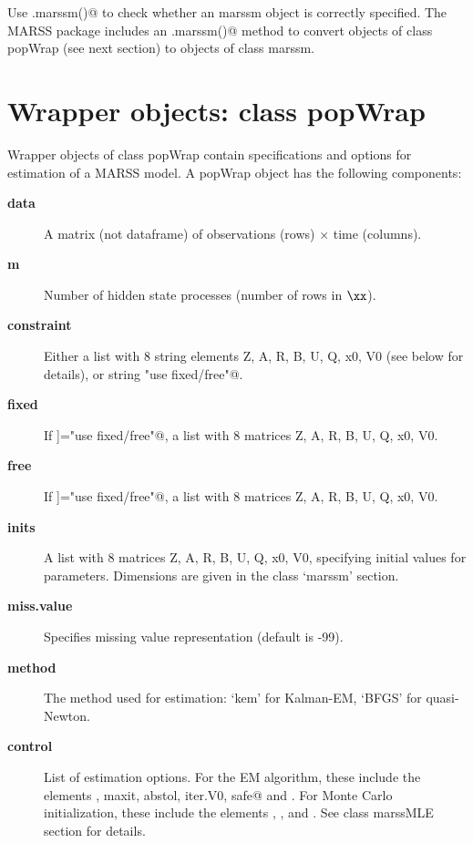 Use \verb@is.marssm()@ to check whether an marssm object is correctly specified. The MARSS package includes an \verb@as.marssm()@ method to convert objects of class popWrap (see next section) to objects of class marssm. 

\section{Wrapper objects: class popWrap}

Wrapper objects of class popWrap contain specifications and options for estimation of a MARSS model. A popWrap object has the following components:

  \begin{description}
  
  \item[\textbf{data}]{ A matrix (not dataframe) of observations (rows) $\times$ time (columns).  }
  \item[\textbf{m}]{ Number of hidden state processes (number of rows in $\xx$). }
  \item[\textbf{constraint}]{ Either a list with 8 string elements Z, A, R, B, U, Q, x0, V0 (see below for details), or string \verb@"use fixed/free"@. }
  \item[\textbf{fixed}]{ If \verb@constraint[[elem]]="use fixed/free"@, a list with 8 matrices Z, A, R, B, U, Q, x0, V0. }
  \item[\textbf{free}]{ If \verb@constraint[[elem]]="use fixed/free"@, a list with 8 matrices Z, A, R, B, U, Q, x0, V0. }
  \item[\textbf{inits}]{ A list with 8 matrices Z, A, R, B, U, Q, x0, V0, specifying initial values for parameters. Dimensions are given in the class `marssm' section. }
  \item[\textbf{miss.value}]{ Specifies missing value representation (default is -99). }
  \item[\textbf{method}]{ The method used for estimation: `kem' for Kalman-EM, `BFGS' for quasi-Newton.}
  \item[\textbf{control}]{ List of estimation options.  For the EM algorithm, these include the elements 
    \verb@minit, maxit, abstol, iter.V0, safe@ and \verb@trace@. For Monte Carlo initialization, these include the elements \verb@MCInit@, \verb@numInits@, \verb@numInitSteps@ and \verb@boundsInits@. See class marssMLE section for details. }  
  \end{description}

